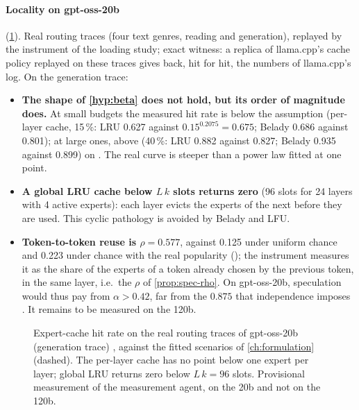 \paragraph{Locality on gpt-oss-20b} (\cref{fig:localite-mesuree}). Real routing traces (four text genres, reading and generation), replayed by the instrument of the loading study; exact witness: a replica of llama.cpp's cache policy replayed on these traces gives back, hit for hit, the numbers of llama.cpp's log. On the generation trace:
\begin{itemize}
\item \textbf{The shape of \cref{hyp:beta} does not hold, but its order of magnitude does.} At small budgets the measured hit rate is below the assumption (per-layer cache, 15\,\%: LRU 0.627 against $0.15^{0.2075} = 0.675$; Belady 0.686 against 0.801); at large ones, above (40\,\%: LRU 0.882 against 0.827; Belady 0.935 against 0.899) \calc{} on \mes. The real curve is steeper than a power law fitted at one point.
\item \textbf{A global LRU cache below $L\,k$ slots returns zero} (96 slots for 24 layers with 4 active experts): each layer evicts the experts of the next before they are used. This cyclic pathology is avoided by Belady and LFU.
\item \textbf{Token-to-token reuse is $\rho = 0.577$}, against 0.125 under uniform chance and 0.223 under chance with the real popularity (); the instrument measures it as the share of the experts of a token already chosen by the previous token, in the same layer, i.e.\ the $\rho$ of \cref{prop:spec-rho}. On gpt-oss-20b, speculation would thus pay from $\alpha > 0.42$, far from the $0.875$ that independence imposes \calc. It remains to be measured on the 120b.
\end{itemize}

\begin{figure}[ht]
\centering
\GrapheLocaliteMesuree
\caption[Measured locality on gpt-oss-20b against the assumptions]{Expert-cache hit rate on the real routing traces of gpt-oss-20b (generation trace) \mes, against the fitted scenarios of \cref{ch:formulation} (dashed). The per-layer cache has no point below one expert per layer; global LRU returns zero below $L\,k = 96$ slots. Provisional measurement of the measurement agent, on the 20b and not on the 120b.}
\label{fig:localite-mesuree}
\end{figure}

